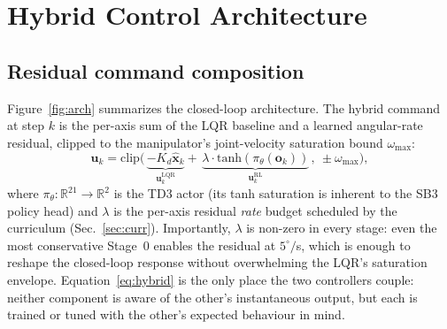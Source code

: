 \documentclass[conference]{IEEEtran}
\newcommand{\R}{\mathbb{R}}
\begin{document}
\section{Hybrid Control Architecture}
\label{sec:hybrid}

\subsection{Residual command composition}
Figure~\ref{fig:arch} summarizes the closed-loop architecture.
The hybrid command at step $k$ is the per-axis sum of the LQR baseline and
a learned angular-rate residual, clipped to the manipulator's joint-velocity
saturation bound $\omega_{\max}$:
\begin{equation}
\bm{u}_k = \mathrm{clip}\!\Big(\,\underbrace{-K_d \hat{\bm{x}}_k}_{\bm{u}^{\text{LQR}}_k}\!+\,\underbrace{\lambda\!\cdot\!\mathrm{tanh}(\pi_\theta(\bm{o}_k))}_{\bm{u}^{\text{RL}}_k}\,,\ \pm\omega_{\max}\Big),
\label{eq:hybrid}
\end{equation}
where $\pi_\theta:\R^{21}\!\to\R^2$ is the TD3 actor (its tanh saturation is
inherent to the SB3 policy head) and $\lambda$ is the per-axis residual
\emph{rate} budget scheduled by the curriculum
(Sec.~\ref{sec:curr}). Importantly, $\lambda$ is non-zero in every stage:
even the most conservative Stage~0 enables the residual at $5^\circ/$s,
which is enough to reshape the closed-loop response without overwhelming
the LQR's saturation envelope. Equation~\eqref{eq:hybrid} is the only place
the two controllers couple: neither component is aware of the other's
instantaneous output, but each is trained or tuned with the other's
expected behaviour in mind.
\end{document}
